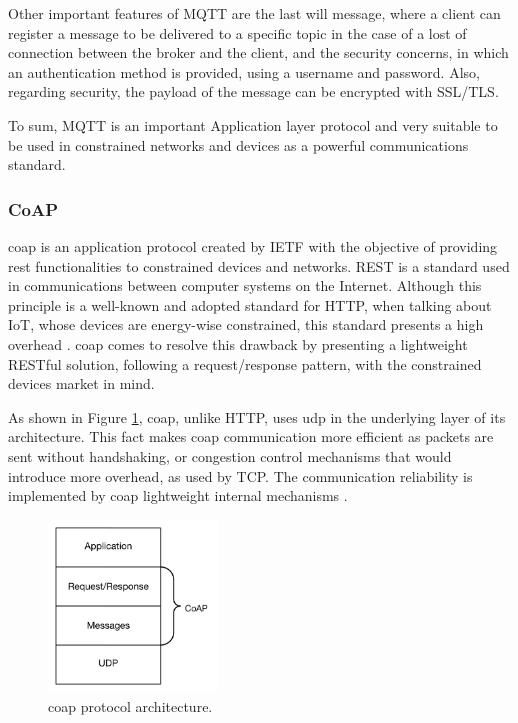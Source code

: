 Other important features of MQTT are the last will message, where a client can register a message to be delivered to a specific topic in the case of a lost of connection between the broker and the client, and the security concerns, in which an authentication method is provided, using a username and password. Also, regarding security, the payload of the message can be encrypted with SSL/TLS.

To sum, MQTT is an important Application layer protocol and very suitable to be used in constrained networks and devices as a powerful communications standard.

\subsubsection{CoAP}

\acf{coap} is an application protocol created by IETF with the objective of providing \acf{rest} functionalities to constrained devices and networks. REST is a standard used in communications between computer systems on the Internet. Although this principle is a well-known and adopted standard for HTTP, when talking about IoT, whose devices are energy-wise constrained, this standard presents a high overhead \cite{Salman2013}. \ac{coap} comes to resolve this drawback by presenting a lightweight RESTful solution, following a request/response pattern, with the constrained devices market in mind.

As shown in Figure \ref{fig:coap}, \ac{coap}, unlike HTTP, uses \ac{udp} in the underlying layer of its architecture. This fact makes \ac{coap} communication more efficient as packets are sent without handshaking, or congestion control mechanisms that would introduce more overhead, as used by TCP. The communication reliability is implemented by \ac{coap} lightweight internal mechanisms \cite{Salman2013}.

\begin{figure}[H]
	\centering
	\includegraphics[width=0.4\textwidth]{figures/coap.png}
	\caption{\ac{coap} protocol architecture.}
	\label{fig:coap}
\end{figure}

